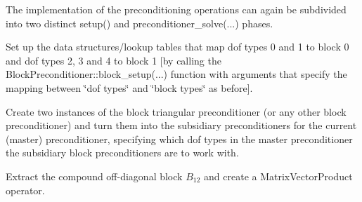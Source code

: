 The implementation of the preconditioning operations can again be subdivided into two distinct {\ttfamily setup()} and {\ttfamily preconditioner\+\_\+solve}(...) phases.
\begin{DoxyItemize}
\item Set up the data structures/lookup tables that map dof types 0 and 1 to block 0 and dof types 2, 3 and 4 to block 1 \mbox{[}by calling the {\ttfamily Block\+Preconditioner\+::block\+\_\+setup}(...) function with arguments that specify the mapping between \char`\"{}dof types\char`\"{} and \char`\"{}block types\char`\"{} as before\mbox{]}.
\item Create two instances of the block triangular preconditioner (or any other block preconditioner) and turn them into the subsidiary preconditioners for the current (master) preconditioner, specifying which dof types in the master preconditioner the subsidiary block preconditioners are to work with.
\item Extract the compound off-\/diagonal block $ B_{12}$ and create a {\ttfamily Matrix\+Vector\+Product} operator.
\end{DoxyItemize}

